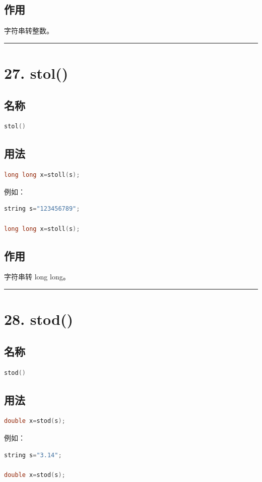 \documentclass[10pt,twocolumn]{extarticle}
\begin{document}
\subsection{作用}
字符串转整数。

\noindent\rule{\linewidth}{0.4pt}

\section{27. stol()}

\subsection{名称}
\begin{lstlisting}[language=C++]
stol()
\end{lstlisting}

\subsection{用法}
\begin{lstlisting}[language=C++]
long long x=stoll(s);
\end{lstlisting}
例如：
\begin{lstlisting}[language=C++]
string s="123456789";

long long x=stoll(s);
\end{lstlisting}

\subsection{作用}
字符串转 long long。

\noindent\rule{\linewidth}{0.4pt}

\section{28. stod()}

\subsection{名称}
\begin{lstlisting}[language=C++]
stod()
\end{lstlisting}

\subsection{用法}
\begin{lstlisting}[language=C++]
double x=stod(s);
\end{lstlisting}
例如：
\begin{lstlisting}[language=C++]
string s="3.14";

double x=stod(s);
\end{lstlisting}
\end{document}
